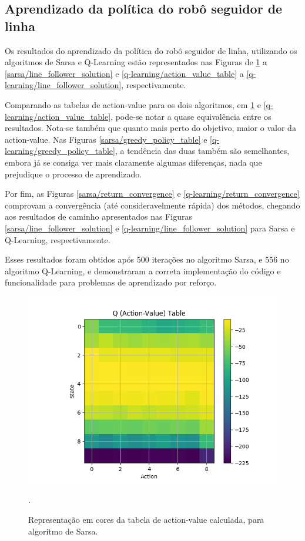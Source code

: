 \documentclass[conference]{IEEEtran}
\begin{document}
\subsection{Aprendizado da política do robô seguidor de linha}

Os resultados do aprendizado da política do robô seguidor de linha, utilizando os algoritmos de Sarsa e Q-Learning estão representados nas Figuras de \ref{sarsa/action_value_table} a \ref{sarsa/line_follower_solution} e \ref{q-learning/action_value_table} a \ref{q-learning/line_follower_solution}, respectivamente.

Comparando as tabelas de action-value para os dois algoritmos, em \ref{sarsa/action_value_table} e \ref{q-learning/action_value_table}, pode-se notar a quase equivalência entre os resultados. Nota-se também que quanto mais perto do objetivo, maior o valor da action-value. Nas Figuras \ref{sarsa/greedy_policy_table} e \ref{q-learning/greedy_policy_table}, a tendência das duas também são semelhantes, embora já se consiga ver mais claramente algumas diferenças, nada que prejudique o processo de aprendizado.

Por fim, as Figuras \ref{sarsa/return_convergence} e \ref{q-learning/return_convergence} comprovam a convergência (até consideravelmente rápida) dos métodos, chegando aos resultados de caminho apresentados nas Figuras \ref{sarsa/line_follower_solution} e \ref{q-learning/line_follower_solution} para Sarsa e Q-Learning, respectivamente.

Esses resultados foram obtidos após 500 iterações no algoritmo Sarsa, e 556 no algoritmo Q-Learning, e demonstraram a correta implementação do código e funcionalidade para problemas de aprendizado por reforço.

\begin{figure}[htbp]
\centering
\centerline{\includegraphics[scale=0.5]{imagens/sarsa/action_value_table.png}}
\caption{Representação em cores da tabela de action-value calculada, para algoritmo de Sarsa.}.
\label{sarsa/action_value_table}
\end{figure}
\end{document}
